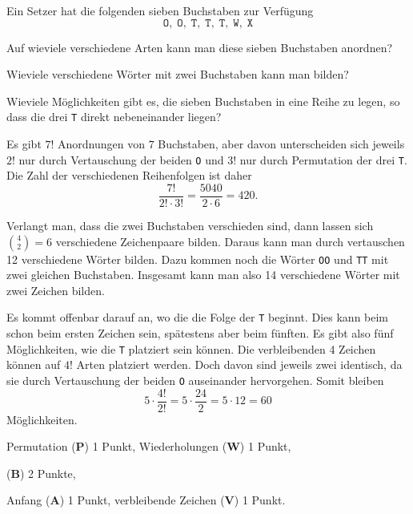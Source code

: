 Ein Setzer hat die folgenden sieben Buchstaben zur Verfügung
\[
\texttt{O},\;
\texttt{O},\;
\texttt{T},\;
\texttt{T},\;
\texttt{T},\;
\texttt{W},\;
\texttt{X}
\]
\begin{teilaufgaben}
\item Auf wieviele verschiedene Arten kann man diese sieben Buchstaben anordnen?
\item Wieviele verschiedene Wörter mit zwei Buchstaben kann man bilden?
\item Wieviele Möglichkeiten gibt es, die sieben Buchstaben in eine Reihe
zu legen, so dass die drei \texttt{T} direkt nebeneinander liegen?
\end{teilaufgaben}


\begin{loesung}
\begin{teilaufgaben}
\item
Es gibt $7!$ Anordnungen von $7$ Buchstaben, aber davon unterscheiden sich
jeweils $2!$ nur durch Vertauschung der beiden \texttt{O} und $3!$ nur
durch Permutation der drei \texttt{T}.
Die Zahl der verschiedenen Reihenfolgen ist daher
\[
\frac{7!}{2!\cdot 3!}=\frac{5040}{2\cdot 6} = 420.
\]
\item
Verlangt man, dass die zwei Buchstaben verschieden sind, dann lassen sich
$\binom{4}{2}=6$ verschiedene Zeichenpaare bilden.
Daraus kann man durch vertauschen 12 verschiedene Wörter bilden.
Dazu kommen noch die Wörter \texttt{OO} und \texttt{TT} mit zwei gleichen
Buchstaben.
Insgesamt kann man also 14 verschiedene Wörter mit zwei Zeichen bilden.
\item
Es kommt offenbar darauf an, wo die die Folge der \texttt{T} beginnt.
Dies kann beim schon beim ersten Zeichen sein, spätestens aber beim fünften.
Es gibt also fünf Möglichkeiten, wie die \texttt{T} platziert sein können.
Die verbleibenden 4 Zeichen können auf $4!$ Arten platziert werden.
Doch davon sind jeweils zwei identisch, da sie durch Vertauschung der
beiden \texttt{O} auseinander hervorgehen.
Somit bleiben 
\[
5\cdot\frac{4!}{2!}=5\cdot \frac{24}{2}=5\cdot 12=60
\]
Möglichkeiten.
\end{teilaufgaben}
\end{loesung}

\begin{bewertung}
\begin{teilaufgaben}
\item Permutation ({\bf P}) 1 Punkt, Wiederholungen ({\bf W}) 1 Punkt,
\item ({\bf B}) 2 Punkte,
\item Anfang ({\bf A}) 1 Punkt, verbleibende Zeichen ({\bf V}) 1 Punkt.
\end{teilaufgaben}
\end{bewertung}

